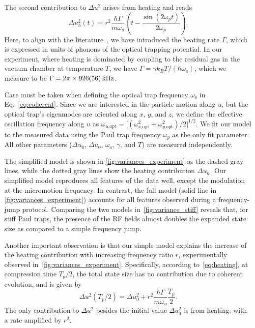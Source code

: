 The second contribution to $\Delta u^2$ arises from heating and reads
%
\begin{equation}
    \label{eq:heating}
    \Delta u_h^2(t) =
	r^2\frac{\hbar\Gamma}{m\omega_o}
	\left(t - \frac{\sin (2\omega_p t)}{2\omega_p} \right).
\end{equation}
Here, to align with the literature~\cite{roda-llordes2023macroscopic}, we have introduced the heating rate $\Gamma$, which is expressed in units of phonons of the optical trapping potential. In our experiment, where heating is dominated by coupling to the residual gas in the vacuum chamber at temperature $T$, we have $\Gamma=\gamma k_B T/(\hbar\omega_o)$, which we measure to be $\Gamma=2\pi\times\SI{926\pm56}{\kilo\hertz}$.

Care must be taken when defining the optical trap frequency $\omega_o$ in Eq.~\eqref{eq:coherent}. Since we are interested in the particle motion along $u$, but the optical trap's eigenmodes are oriented along $x$, $y$, and $z$, we define the effective oscillation frequency along $u$ as $\omega_{u\text{,opt}}={[(\omega_{x\text{,opt}}^2 + \omega_{y\text{,opt}}^2)/2}]^{1/2}$. We fit our model to the measured data using the Paul trap frequency $\omega_p$ as the only fit parameter. 
All other parameters ($\Delta u_0$, $\Delta \dot{u}_0$, $\omega_o$, $\gamma$, and $T$) are measured independently.

The simplified model is shown in \cref{fig:variances_experiment} as the dashed gray lines, while the dotted gray lines show the heating contribution $\Delta u_h$. Our simplified model reproduces all features of the data well, except the modulation at the micromotion frequency.
In contrast, the full model (solid line in \cref{fig:variances_experiment}) accounts for all features observed during a frequency-jump protocol. 
Comparing the two models in~\cref{fig:variance_stiff} reveals that, for stiff Paul traps, the presence of the RF fields almost doubles the expanded state size as compared to a simple frequency jump.

Another important observation is that our simple model explains the increase of the heating contribution with increasing frequency ratio $r$, experimentally observed in~\cref{fig:variances_experiment}. 
Specifically, according to~\cref{eq:heating}, at compression time $T_p/2$, the total state size has no contribution due to coherent evolution, and is given by
\begin{equation}
    \label{eq:compression_time_state_size}
    \Delta u^2(T_p/2) = \Delta u_0^2 + r^2\frac{\hbar\Gamma}{m\omega_o} \frac{T_p}{2}.
\end{equation}
The only contribution to $\Delta u^2$ besides the initial value $\Delta u_0^2$ is from heating, with a rate amplified by $r^2$. 

